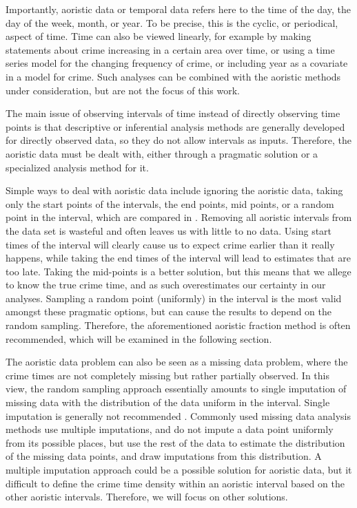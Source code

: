Importantly, aoristic data or temporal data refers here to the time of the day, the day of the week, month, or year. To be precise, this is the cyclic, or periodical, aspect of time. Time can also be viewed linearly, for example by making statements about crime increasing in a certain area over time, or using a time series model for the changing frequency of crime, or including year as a covariate in a model for crime. Such analyses can be combined with the aoristic methods under consideration, but are not the focus of this work.

The main issue of observing intervals of time instead of directly observing time points is that descriptive or inferential analysis methods are generally developed for directly observed data, so they do not allow intervals as inputs. Therefore, the aoristic data must be dealt with, either through a pragmatic solution or a specialized analysis method for it.

Simple ways to deal with aoristic data include ignoring the aoristic data, taking only the start points of the intervals, the end points, mid points, or a random point in the interval, which are compared in \citet{ashby2013comparison}. Removing all aoristic intervals from the data set is wasteful and often leaves us with little to no data. Using start times of the interval will clearly cause us to expect crime earlier than it really happens, while taking the end times of the interval will lead to estimates that are too late. Taking the mid-points is a better solution, but this means that we allege to know the true crime time, and as such overestimates our certainty in our analyses. Sampling a random point (uniformly) in the interval is the most valid amongst these pragmatic options, but can cause the results to depend on the random sampling. Therefore, the aforementioned aoristic fraction method is often recommended, which will be examined in the following section.

The aoristic data problem can also be seen as a missing data problem, where the crime times are not completely missing but rather partially observed.  In this view, the random sampling approach essentially amounts to single imputation of missing data with the distribution of the data uniform in the interval. Single imputation is generally not recommended \citep{van2018flexible}. Commonly used missing data analysis methods use multiple imputations, and do not impute a data point uniformly from its possible places, but use the rest of the data to estimate the distribution of the missing data points, and draw imputations from this distribution. A multiple imputation approach could be a possible solution for aoristic data, but it difficult to define the crime time density within an aoristic interval based on the other aoristic intervals. Therefore, we will focus on other solutions.

